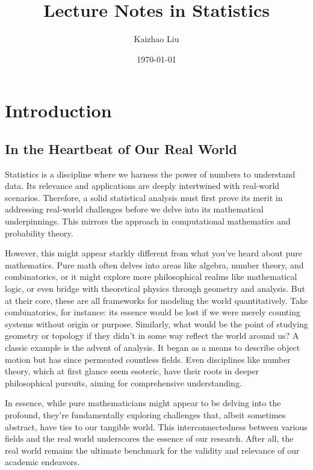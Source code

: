 \documentclass{book}
\title{Lecture Notes in Statistics}
\author{Kaizhao Liu}
\date{\today}
\begin{document}
\maketitle
\tableofcontents



\chapter{Introduction}
\section{In the Heartbeat of Our Real World}
Statistics is a discipline where we harness the power of numbers to understand data. Its relevance and applications are deeply intertwined with real-world scenarios. 
Therefore, a solid statistical analysis must first prove its merit in addressing real-world challenges before we delve into its mathematical underpinnings. 
This mirrors the approach in computational mathematics and probability theory.


However, this might appear starkly different from what you've heard about pure mathematics. 
Pure math often delves into areas like algebra, number theory, and combinatorics, or it might explore more philosophical realms like mathematical logic, or even bridge with theoretical physics through geometry and analysis. 
But at their core, these are all frameworks for modeling the world quantitatively. 
Take combinatorics, for instance: its essence would be lost if we were merely counting systems without origin or purpose. 
Similarly, what would be the point of studying geometry or topology if they didn't in some way reflect the world around us? 
A classic example is the advent of analysis. It began as a means to describe object motion but has since permeated countless fields. 
Even disciplines like number theory, which at first glance seem esoteric, have their roots in deeper philosophical pursuits, aiming for comprehensive understanding.

In essence, while pure mathematicians might appear to be delving into the profound, they're fundamentally exploring challenges that, albeit sometimes abstract, have ties to our tangible world. 
This interconnectedness between various fields and the real world underscores the essence of our research. 
After all, the real world remains the ultimate benchmark for the validity and relevance of our academic endeavors.
\end{document}
